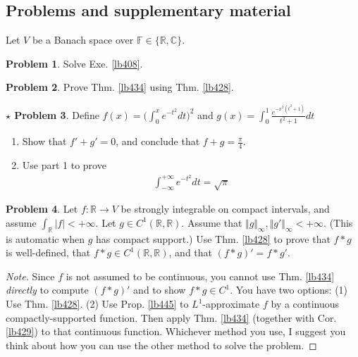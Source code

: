 \documentclass[12pt,b5paper,notitlepage]{article}
\theoremstyle{definition}
\newtheorem{prob}{\color{red}Problem}[section]
\newtheorem{sprob}[prob]{\color{red}$\star$ Problem}
\theoremstyle{plain}
\newcommand{\Cbb}{\mathbb C}
\newcommand{\Rbb}{\mathbb R}
\newcommand{\Fbb}{\mathbb F}
\newcommand{\dps}{\displaystyle}
\numberwithin{equation}{section}
\begin{document}
\subsection{Problems and supplementary material}



Let $V$ be a Banach space over $\Fbb\in\{\Rbb,\Cbb\}$.

\begin{prob}
Solve Exe. \ref{lb408}.
\end{prob}

\begin{prob}\label{lb430}
Prove Thm. \ref{lb434} using Thm. \ref{lb428}.
\end{prob}


\begin{sprob}\label{lb435}
Define $\dps f(x)=\Big(\int_0^x e^{-t^2}dt\Big)^2$ and $\dps g(x)=\int_0^1\frac{e^{-x^2(t^2+1)}}{t^2+1}dt$
\begin{enumerate}
\item Show that $f'+g'=0$, and conclude that $f+g=\frac\pi 4$.
\item Use part 1 to prove
\begin{align}
\int_{-\infty}^{+\infty}e^{-t^2}dt=\sqrt\pi 
\end{align}
\end{enumerate}
\end{sprob}


\begin{prob}\label{lb439}
Let $f:\Rbb\rightarrow V$ be strongly integrable on compact intervals, and assume $\int_\Rbb |f|<+\infty$. Let $g\in C^1(\Rbb,\Rbb)$. Assume that $\Vert g\Vert_\infty,\Vert g'\Vert_\infty<+\infty$. (This is automatic when $g$ has compact support.) Use Thm. \ref{lb428} to prove that $f*g$ is well-defined, that $f*g\in C^1(\Rbb,\Rbb)$, and that $(f*g)'=f*g'$.
\end{prob}

\begin{proof}[Note]
Since $f$ is not assumed to be continuous, you cannot use Thm. \ref{lb434} \textit{directly} to compute $(f*g)'$ and to show $f*g\in C^1$. You have two options: (1) Use Thm. \ref{lb428}. (2) Use Prop. \ref{lb445} to  $L^1$-approximate $f$ by a continuous compactly-supported function. Then apply Thm. \ref{lb434} (together with Cor. \ref{lb429}) to that continuous function. Whichever method you use, I suggest you think about how you can use the other method to solve the problem.
\end{proof}
\end{document}
